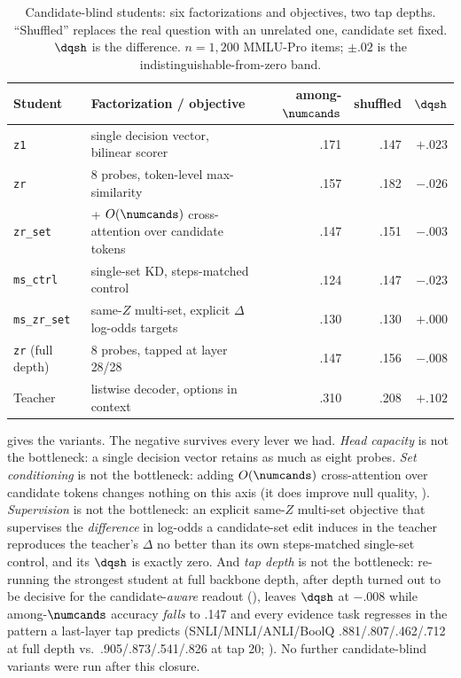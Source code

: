 \begin{table}[t]
  \centering
  \caption{Candidate-blind students: six factorizations and objectives, two tap depths. ``Shuffled''
  replaces the real question with an unrelated one, candidate set fixed. $\dqsh$ is the difference.
  $n{=}1{,}200$ MMLU-Pro items; $\pm.02$ is the indistinguishable-from-zero band.}
  \label{tab:blind}
  \small
  \begin{tabular}{llrrr}
    \toprule
    Student & Factorization / objective & among-$\numcands$ & shuffled & $\dqsh$ \\
    \midrule
    \texttt{z1} & single decision vector, bilinear scorer & .171 & .147 & $+.023$ \\
    \texttt{zr} & 8 probes, token-level max-similarity & .157 & .182 & $-.026$ \\
    \texttt{zr\_set} & + $O(\numcands)$ cross-attention over candidate tokens & .147 & .151 & $-.003$ \\
    \texttt{ms\_ctrl} & single-set KD, steps-matched control & .124 & .147 & $-.023$ \\
    \texttt{ms\_zr\_set} & same-$Z$ multi-set, explicit $\Delta$log-odds targets & .130 & .130 & $+.000$ \\
    \texttt{zr} (full depth) & 8 probes, tapped at layer 28/28 & .147 & .156 & $-.008$ \\
    \midrule
    Teacher & listwise decoder, options in context & .310 & .208 & $\mathbf{+.102}$ \\
    \bottomrule
  \end{tabular}
\end{table}

 gives the variants. The negative survives every lever we had. \emph{Head capacity} is
not the bottleneck: a single decision vector retains as much as eight probes. \emph{Set conditioning}
is not the bottleneck: adding $O(\numcands)$ cross-attention over candidate tokens changes nothing on
this axis (it does improve null quality, ). \emph{Supervision} is not the
bottleneck: an explicit same-$Z$ multi-set objective that supervises the \emph{difference} in log-odds
a candidate-set edit induces in the teacher reproduces the teacher's $\Delta$ no better than its own
steps-matched single-set control, and its $\dqsh$ is exactly zero. And \emph{tap depth} is not the
bottleneck: re-running the strongest student at full backbone depth, after depth turned out to be
decisive for the candidate-\emph{aware} readout (), leaves $\dqsh$ at $-.008$ while
among-$\numcands$ accuracy \emph{falls} to .147 and every evidence task regresses in the pattern a
last-layer tap predicts (SNLI/MNLI/ANLI/BoolQ .881/.807/.462/.712 at full depth vs.\ .905/.873/.541/.826
at tap 20; ). No further candidate-blind variants were run after this
closure.

